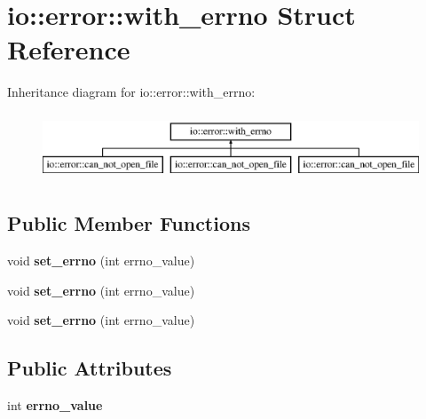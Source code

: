 \hypertarget{structio_1_1error_1_1with__errno}{}\section{io\+:\+:error\+:\+:with\+\_\+errno Struct Reference}
\label{structio_1_1error_1_1with__errno}
Inheritance diagram for io\+:\+:error\+:\+:with\+\_\+errno\+:\begin{figure}[H]
\begin{center}
\leavevmode
\includegraphics[height=2.000000cm]{d2/dc1/structio_1_1error_1_1with__errno}
\end{center}
\end{figure}
\subsection*{Public Member Functions}
\begin{DoxyCompactItemize}
\item 
\mbox{\label{structio_1_1error_1_1with__errno_a572cfa4b4a96792cd1d17dc9ad2eb5a9}} 
void {\bfseries set\+\_\+errno} (int errno\+\_\+value)
\item 
\mbox{\label{structio_1_1error_1_1with__errno_a572cfa4b4a96792cd1d17dc9ad2eb5a9}} 
void {\bfseries set\+\_\+errno} (int errno\+\_\+value)
\item 
\mbox{\label{structio_1_1error_1_1with__errno_a572cfa4b4a96792cd1d17dc9ad2eb5a9}} 
void {\bfseries set\+\_\+errno} (int errno\+\_\+value)
\end{DoxyCompactItemize}
\subsection*{Public Attributes}
\begin{DoxyCompactItemize}
\item 
\mbox{\label{structio_1_1error_1_1with__errno_a99dcacba02cb53351fe64d7e064406be}} 
int {\bfseries errno\+\_\+value}
\end{DoxyCompactItemize}


